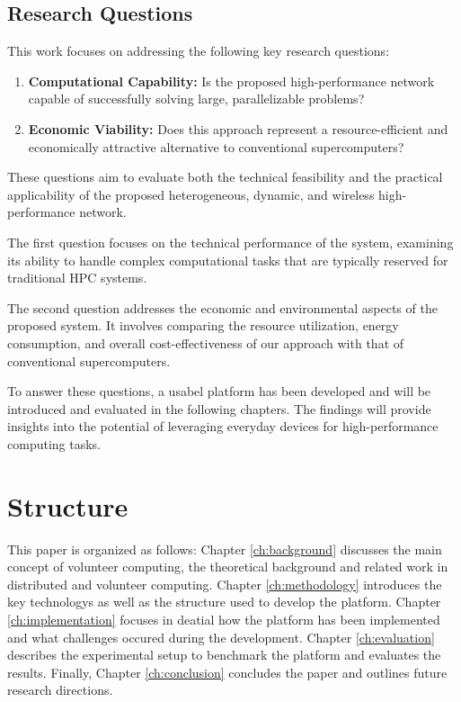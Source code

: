 \subsection{Research Questions}
\label{subsec:into:objectives:questions}
This work focuses on addressing the following key research questions:

\begin{enumerate}
    \item \textbf{Computational Capability:} Is the proposed high-performance network capable of successfully solving large, parallelizable problems?
    
    \item \textbf{Economic Viability:} Does this approach represent a resource-efficient and economically attractive alternative to conventional supercomputers?
\end{enumerate}

These questions aim to evaluate both the technical feasibility and the practical applicability of the proposed heterogeneous, dynamic, and wireless high-performance network.

The first question focuses on the technical performance of the system, examining its ability to handle complex computational tasks that are typically reserved for traditional \ac{HPC} systems.

The second question addresses the economic and environmental aspects of the proposed system. It involves comparing the resource utilization, energy consumption, and overall cost-effectiveness of our approach with that of conventional supercomputers.

To answer these questions, a usabel platform has been developed and will be introduced and evaluated in the following chapters. The findings will provide insights into the potential of leveraging everyday devices for high-performance computing tasks.

\section{Structure}
\label{sec:intro:structure}
This paper is organized as follows: Chapter \ref{ch:background} discusses the main concept of volunteer computing, the theoretical background and related work in distributed and volunteer computing. Chapter \ref{ch:methodology} introduces the key technologys as well as the structure used to develop the platform. Chapter \ref{ch:implementation} focuses in deatial how the platform has been implemented and what challenges occured during the development. Chapter \ref{ch:evaluation} describes the experimental setup to benchmark the platform and evaluates the results. Finally, Chapter \ref{ch:conclusion} concludes the paper and outlines future research directions.